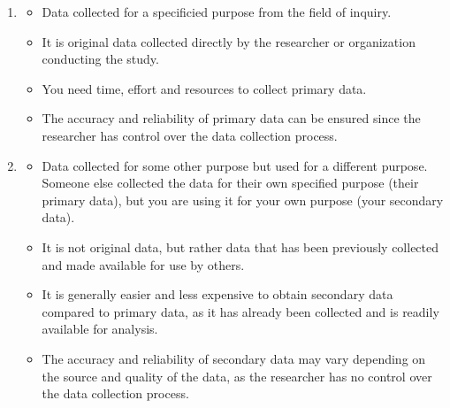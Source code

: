 \documentclass[openany]{book}
\begin{document}
\begin{enumerate}
    \item {}
    \begin{itemize}
        \item Data collected for a specificied purpose from the field of inquiry.
        \item It is original data collected directly by the researcher or organization conducting the study.
        \item You need time, effort and resources to collect primary data.
        \item The accuracy and reliability of primary data can be ensured since the researcher has control over the data collection process.
    \end{itemize}
    \item {}
    \begin{itemize}
        \item Data collected for some other purpose but used for a different purpose. Someone else collected the data for their own specified purpose (their primary data), but you are using it for your own purpose (your secondary data).
        \item It is not original data, but rather data that has been previously collected and made available for use by others.
        \item It is generally easier and less expensive to obtain secondary data compared to primary data, as it has already been collected and is readily available for analysis. 
        \item The accuracy and reliability of secondary data may vary depending on the source and quality of the data, as the researcher has no control over the data collection process.
    \end{itemize}
\end{enumerate}
\end{document}
